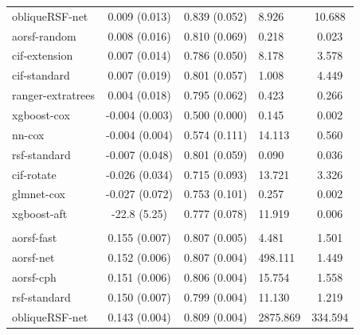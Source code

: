 \documentclass[twoside,11pt]{article}\usepackage[]{graphicx}\usepackage[]{xcolor}
\newenvironment{knitrout}{}{} %
\begin{document}
\begin{knitrout}
\begin{longtable}[t]{lcclc}
\hspace{1em}obliqueRSF-net & 0.009 (0.013) & 0.839 (0.052) & 8.926 & 10.688\\
\hspace{1em}aorsf-random & 0.008 (0.016) & 0.810 (0.069) & 0.218 & 0.023\\
\hspace{1em}cif-extension & 0.007 (0.014) & 0.786 (0.050) & 8.178 & 3.578\\
\hspace{1em}cif-standard & 0.007 (0.019) & 0.801 (0.057) & 1.008 & 4.449\\
\hspace{1em}ranger-extratrees & 0.004 (0.018) & 0.795 (0.062) & 0.423 & 0.266\\
\hspace{1em}xgboost-cox & -0.004 (0.003) & 0.500 (0.000) & 0.145 & 0.002\\
\hspace{1em}nn-cox & -0.004 (0.004) & 0.574 (0.111) & 14.113 & 0.560\\
\hspace{1em}rsf-standard & -0.007 (0.048) & 0.801 (0.059) & 0.090 & 0.036\\
\hspace{1em}cif-rotate & -0.026 (0.034) & 0.715 (0.093) & 13.721 & 3.326\\
\hspace{1em}glmnet-cox & -0.027 (0.072) & 0.753 (0.101) & 0.257 & 0.002\\
\hspace{1em}xgboost-aft & -22.8 (5.25) & 0.777 (0.078) & 11.919 & 0.006\\
\addlinespace[0.3em]
\hline
\multicolumn{5}{l}{\textit{\textbf{ARIC; coronary heart disease, n = 13623, p = 41}}}\\
\hline
\hspace{1em}aorsf-fast & 0.155 (0.007) & 0.807 (0.005) & 4.481 & 1.501\\
\hspace{1em}aorsf-net & 0.152 (0.006) & 0.807 (0.004) & 498.111 & 1.449\\
\hspace{1em}aorsf-cph & 0.151 (0.006) & 0.806 (0.004) & 15.754 & 1.558\\
\hspace{1em}rsf-standard & 0.150 (0.007) & 0.799 (0.004) & 11.130 & 1.219\\
\hspace{1em}obliqueRSF-net & 0.143 (0.004) & 0.809 (0.004) & 2875.869 & 334.594\\

\end{longtable}
\end{knitrout}
\end{document}
